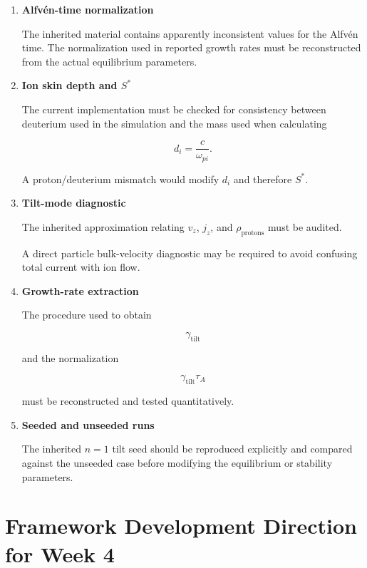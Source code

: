 \documentclass[11pt,a4paper]{article}
\begin{document}
\begin{enumerate}
    \item \textbf{Alfv\'en-time normalization}

    The inherited material contains apparently inconsistent values for the
    Alfv\'en time. The normalization used in reported growth rates must be
    reconstructed from the actual equilibrium parameters.

    \item \textbf{Ion skin depth and \(S^*\)}

    The current implementation must be checked for consistency between
    deuterium used in the simulation and the mass used when calculating

    \[
    d_i = \frac{c}{\omega_{pi}}.
    \]

    A proton/deuterium mismatch would modify \(d_i\) and therefore \(S^*\).

    \item \textbf{Tilt-mode diagnostic}

    The inherited approximation relating \(v_z\), \(j_z\), and
    \(\rho_{\mathrm{protons}}\) must be audited.

    A direct particle bulk-velocity diagnostic may be required to avoid
    confusing total current with ion flow.

    \item \textbf{Growth-rate extraction}

    The procedure used to obtain

    \[
    \gamma_{\mathrm{tilt}}
    \]

    and the normalization

    \[
    \gamma_{\mathrm{tilt}}\tau_A
    \]

    must be reconstructed and tested quantitatively.

    \item \textbf{Seeded and unseeded runs}

    The inherited \(n=1\) tilt seed should be reproduced explicitly and
    compared against the unseeded case before modifying the equilibrium or
    stability parameters.
\end{enumerate}

\section{Framework Development Direction for Week 4}
\end{document}
